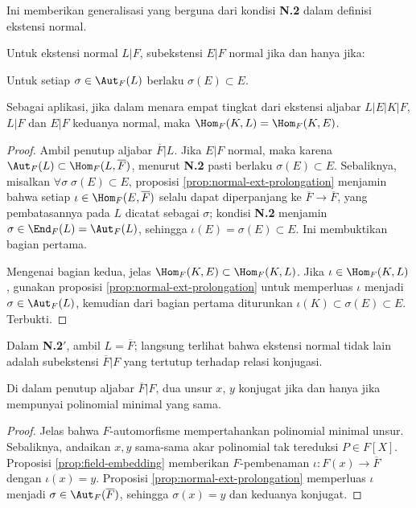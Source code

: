Ini memberikan generalisasi yang berguna dari kondisi \textbf{N.2} dalam definisi ekstensi normal.
\begin{corollary}\label{prop:normal-subext}
	Untuk ekstensi normal $L|F$, subekstensi $E|F$ normal jika dan hanya jika:
	\begin{compactdesc}
		\item[\bfseries {N}.2$'$] Untuk setiap $\sigma \in \Aut_F(L)$ berlaku $\sigma(E) \subset E$.
	\end{compactdesc}
	Sebagai aplikasi, jika dalam menara empat tingkat dari ekstensi aljabar $L|E|K|F$, $L|F$ dan $E|F$ keduanya normal, maka $\Hom_F(K, L) = \Hom_F(K, E)$.
\end{corollary}
\begin{proof}
	Ambil penutup aljabar $\overline{F}|L$. Jika $E|F$ normal, maka karena $\Aut_F(L) \subset \Hom_F(L, \overline{F})$, menurut \textbf{N.2} pasti berlaku $\sigma(E) \subset E$. Sebaliknya, misalkan $\forall\sigma\; \sigma(E) \subset E$, proposisi \ref{prop:normal-ext-prolongation} menjamin bahwa setiap $\iota \in \Hom_F(E, \overline{F})$ selalu dapat diperpanjang ke $\overline{F} \to \overline{F}$, yang pembatasannya pada $L$ dicatat sebagai $\sigma$; kondisi \textbf{N.2} menjamin $\sigma \in \End_F(L) = \Aut_F(L)$, sehingga $\iota(E) = \sigma(E) \subset E$. Ini membuktikan bagian pertama.

	Mengenai bagian kedua, jelas $\Hom_F(K,E) \subset \Hom_F(K,L)$. Jika $\iota \in \Hom_F(K,L)$, gunakan proposisi \ref{prop:normal-ext-prolongation} untuk memperluas $\iota$ menjadi $\sigma \in \Aut_F(L)$, kemudian dari bagian pertama diturunkan $\iota(K) \subset \sigma(E) \subset E$. Terbukti.
\end{proof}
Dalam \textbf{N.2$'$}, ambil $L = \overline{F}$; langsung terlihat bahwa ekstensi normal tidak lain adalah subekstensi $\overline{F}|F$ yang tertutup terhadap relasi konjugasi.

\begin{corollary}\label{prop:root-conjugate}
	Di dalam penutup aljabar $\overline{F}|F$, dua unsur $x$, $y$ konjugat jika dan hanya jika mempunyai polinomial minimal yang sama.
\end{corollary}
\begin{proof}
	Jelas bahwa $F$-automorfisme mempertahankan polinomial minimal unsur. Sebaliknya, andaikan $x,y$ sama-sama akar polinomial tak tereduksi $P \in F[X]$. Proposisi \ref{prop:field-embedding} memberikan $F$-pembenaman $\iota: F(x) \to \overline{F}$ dengan $\iota(x)=y$. Proposisi \ref{prop:normal-ext-prolongation} memperluas $\iota$ menjadi $\sigma \in \Aut_F(\overline{F})$, sehingga $\sigma(x)=y$ dan keduanya konjugat.
\end{proof}

